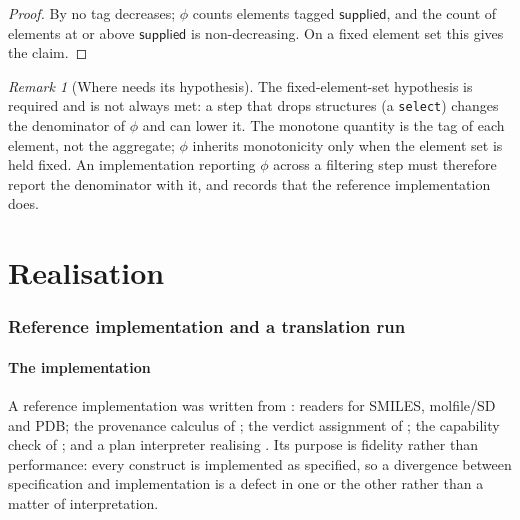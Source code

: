 \documentclass[11pt,twocolumn,a4paper]{article}
\theoremstyle{msthm}
\theoremstyle{definition}
\theoremstyle{remark}
\newtheorem{remark}[theorem]{Remark}
\newcommand{\ms}[1]{\texttt{#1}}
\newcommand{\supplied}{\textsf{supplied}}
\begin{document}
\begin{proof}
By  no tag decreases; $\phi$ counts elements
tagged $\supplied$, and the count of elements at or above $\supplied$ is
non-decreasing. On a fixed element set this gives the claim.
\end{proof}

\begin{remark}[Where  needs its hypothesis]
\label{rem:phi-fixed}
The fixed-element-set hypothesis is required and is not always met: a
step that drops structures (a \ms{select}) changes the denominator of
$\phi$ and can lower it. The monotone quantity is the tag of each
element, not the aggregate; $\phi$ inherits monotonicity only when the
element set is held fixed. An implementation reporting $\phi$ across a
filtering step must therefore report the denominator with it, and
 records that the reference implementation
does.
\end{remark}

\part{Realisation}

\section{Reference implementation and a translation run}
\label{sec:implementation}

\subsection{The implementation}

A reference implementation was written from
: readers for SMILES, molfile/SD and
PDB; the provenance calculus of ; the verdict
assignment of ; the capability check of
; and a plan interpreter realising
. Its purpose is fidelity rather than performance:
every construct is implemented as specified, so a divergence between
specification and implementation is a defect in one or the other rather
than a matter of interpretation.
\end{document}
